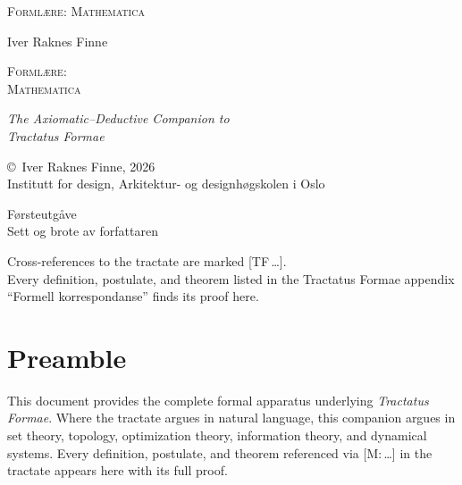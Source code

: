 \documentclass[10pt]{article}
\renewcommand{\footnotesize}{\fontsize{8pt}{10pt}\selectfont}
\renewcommand{\small}{\fontsize{9pt}{11pt}\selectfont}
\renewcommand{\normalsize}{\fontsize{10.5pt}{13pt}\selectfont}
\theoremstyle{definition}
\theoremstyle{plain}
\theoremstyle{remark}
\newcommand{\TF}[1]{\textnormal{[TF\,#1]}}  %
\begin{document}
\thispagestyle{empty}
\vspace*{5cm}
\begin{center}
{\fontsize{14pt}{17pt}\selectfont\scshape Forml\ae re: Mathematica}
\end{center}
\newpage

\thispagestyle{empty}
\vspace*{3cm}
\begin{center}
{\normalsize Iver Raknes Finne}

\vspace{1.5cm}
{\fontsize{22pt}{26pt}\selectfont\scshape Forml\ae re:\\[6pt]
Mathematica}

\vspace{0.6cm}
{\normalsize\itshape The Axiomatic--Deductive Companion to\\[3pt]
Tractatus Formae}
\end{center}
\vfill
\begin{center}
{\small 2026}
\end{center}
\newpage

\thispagestyle{empty}
\vspace*{\fill}
{\footnotesize
\copyright\ Iver Raknes Finne, 2026\\
Institutt for design, Arkitektur- og designh\o gskolen i Oslo

\medskip
F\o rsteutg\aa ve\\
Sett og brote av forfattaren

\medskip
Cross-references to the tractate are marked \TF{\ldots}.\\
Every definition, postulate, and theorem listed in the Tractatus Formae
appendix ``Formell korrespondanse'' finds its proof here.}
\newpage

\tableofcontents
\newpage

\section*{Preamble}

This document provides the complete formal apparatus underlying
\textit{Tractatus Formae}. Where the tractate argues in natural language,
this companion argues in set theory, topology, optimization theory,
information theory, and dynamical systems. Every definition, postulate,
and theorem referenced via \textup{[M:\,\ldots]} in the tractate appears
here with its full proof.
\end{document}
